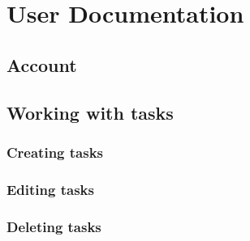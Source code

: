 \section{User Documentation}

\subsection{Account}
\subsection{Working with tasks}
\subsubsection{Creating tasks}
\subsubsection{Editing tasks}
\subsubsection{Deleting tasks}